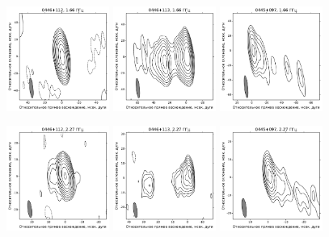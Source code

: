 \addtocounter{figure}{-1}
\begin{figure}
  \centering

  \includegraphics[width=0.3\textwidth]{0446+112_L.pdf}
  \includegraphics[width=0.3\textwidth]{0446+113_L.pdf}
  \includegraphics[width=0.3\textwidth]{0445+097_L.pdf}


  \includegraphics[width=0.3\textwidth]{0446+112_S.pdf}
  \includegraphics[width=0.3\textwidth]{0446+113_S.pdf}
  \includegraphics[width=0.3\textwidth]{0445+097_S.pdf}



\end{figure}
